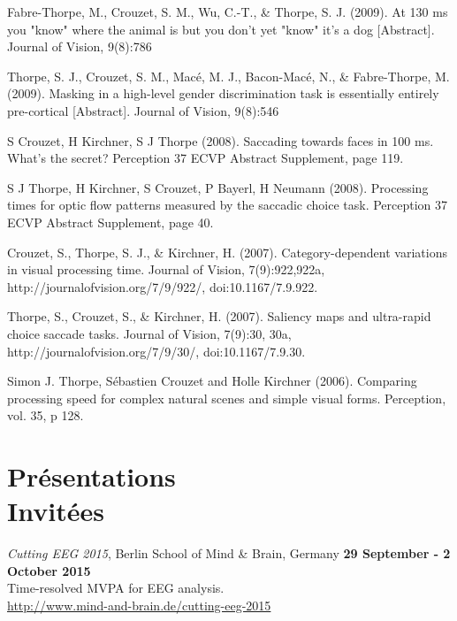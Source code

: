 \documentclass[margin,line]{resume}
\begin{document}
\begin{resume}
	\vspace{-2mm} Fabre-Thorpe, M., Crouzet, S. M., Wu, C.-T., \& Thorpe, S. J. (2009). At 130 ms you "know" where the animal is but you don't yet "know" it's a dog [Abstract]. Journal of Vision, 9(8):786

	\vspace{-2mm} Thorpe, S. J., Crouzet, S. M., Macé, M. J., Bacon-Macé, N., \& Fabre-Thorpe, M. (2009). Masking in a high-level gender discrimination task is essentially entirely pre-cortical [Abstract]. Journal of Vision, 9(8):546

	\vspace{-2mm} S Crouzet, H Kirchner, S J Thorpe (2008). Saccading towards faces in 100 ms. What's the secret? Perception 37 ECVP Abstract Supplement, page 119. 
	
	\vspace{-2mm} S J Thorpe, H Kirchner, S Crouzet, P Bayerl, H Neumann (2008). Processing times for optic flow patterns measured by the saccadic choice task. Perception 37 ECVP Abstract Supplement, page 40.

	\vspace{-2mm} Crouzet, S., Thorpe, S. J., \& Kirchner, H. (2007). Category-dependent variations in visual processing time. Journal of Vision, 7(9):922,922a, http://journalofvision.org/7/9/922/, doi:10.1167/7.9.922.

	\vspace{-2mm} Thorpe, S., Crouzet, S., \& Kirchner, H. (2007). Saliency maps and ultra-rapid choice saccade tasks. Journal of Vision, 7(9):30, 30a, http://journalofvision.org/7/9/30/, doi:10.1167/7.9.30.

	\vspace{-2mm} Simon J. Thorpe, Sébastien Crouzet and Holle Kirchner (2006). Comparing processing speed for complex natural scenes and simple visual forms. Perception, vol. 35, p 128.

	\normalsize

\vspace{3mm}
\section{\mysidestyle Présentations\\Invitées}
    
	\footnotesize

	\textit{Cutting EEG 2015}, Berlin School of Mind \& Brain, Germany \hfill \textbf{29 September - 2 October 2015}\\
	Time-resolved MVPA for EEG analysis. \\
	\url{http://www.mind-and-brain.de/cutting-eeg-2015}
	

\end{resume}
\end{document}

